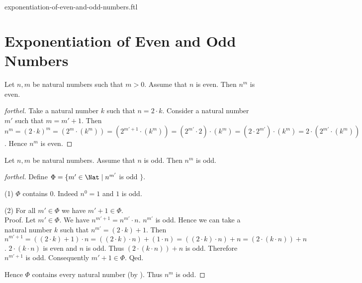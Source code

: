 \documentclass{naproche-library}
\begin{document}
\begin{smodule}{exponentiation-of-even-and-odd-numbers.ftl}

  \section*{Exponentiation of Even and Odd Numbers}

  \begin{proposition}[forthel,id=ARITHMETIC_15_1023659658745214]
    Let $n, m$ be natural numbers such that $m > 0$.
    Assume that $n$ is even.
    Then $n^{m}$ is even.
  \end{proposition}
  \begin{proof}[forthel]
    Take a natural number $k$ such that $n = 2 \cdot k$.
    Consider a natural number $m'$ such that $m = m' + 1$.
    Then $n^{m}
      = (2 \cdot k)^{m}
      = (2^{m} \cdot (k^{m}))
      = (2^{m' + 1} \cdot (k^{m}))
      = (2^{m'} \cdot 2) \cdot (k^{m})
      = (2 \cdot 2^{m'}) \cdot (k^{m})
      = 2 \cdot (2^{m'} \cdot (k^{m}))$.
    Hence $n^{m}$ is even.
  \end{proof}

  \begin{proposition}[forthel,id=ARITHMETIC_15_0021200236556985]
    Let $n, m$ be natural numbers.
    Assume that $n$ is odd.
    Then $n^{m}$ is odd.
  \end{proposition}
  \begin{proof}[forthel]
    Define $\Phi = \{ m' \in \Nat \mid n^{m'}$ is odd $\}$.

    (1) $\Phi$ contains $0$.
    Indeed $n^{0} = 1$ and $1$ is odd.

    (2) For all $m' \in \Phi$ we have $m' + 1 \in \Phi$. \\
    Proof.
      Let $m' \in \Phi$.
      We have $n^{m' + 1} = n^{m'} \cdot n$.
      $n^{m'}$ is odd.
      Hence we can take a natural number $k$ such that $n^{m'} = (2 \cdot k) + 1$.
      Then $n^{m' + 1}
        = ((2 \cdot k) + 1) \cdot n
        = ((2 \cdot k) \cdot n) + (1 \cdot n)
        = ((2 \cdot k) \cdot n) + n
        = (2 \cdot (k \cdot n)) + n$.
      $2 \cdot (k \cdot n)$ is even and $n$ is odd.
      Thus $(2 \cdot (k \cdot n)) + n$ is odd.
      Therefore $n^{m' + 1}$ is odd.
      Consequently $m' + 1 \in \Phi$.
    Qed.

    Hence $\Phi$ contains every natural number (by ).
    Thus $n^{m}$ is odd.
  \end{proof}
\end{smodule}
\end{document}
